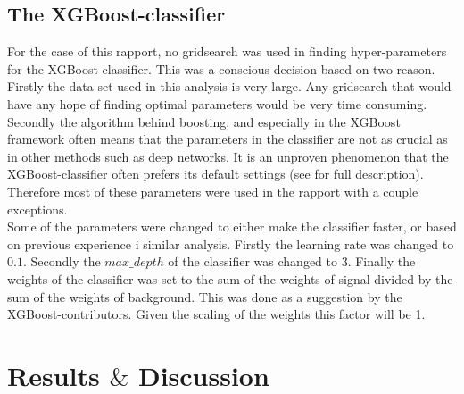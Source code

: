 \documentclass{article}
\begin{document}
\subsection{The XGBoost-classifier}
For the case of this rapport, no gridsearch was used in finding hyper-parameters for the XGBoost-classifier. This was a conscious decision based on two reason. Firstly the data set used in this analysis is very large. Any gridsearch that would have any hope of finding optimal parameters would be very time consuming. Secondly the algorithm behind boosting, and especially in the XGBoost framework often means that the parameters in the classifier are not as crucial as in other methods such as deep networks. It is an unproven phenomenon that the XGBoost-classifier often prefers its default settings (see \cite{XGB} for full description). Therefore most of these parameters were used in the rapport with a couple exceptions.
\\
Some of the parameters were changed to either make the classifier faster, or based on previous experience i similar analysis. Firstly the learning rate was changed to $0.1$. Secondly the $max\_depth$ of the classifier was changed to 3. Finally the weights of the classifier was set to the sum of the weights of signal divided by the sum of the weights of background. This was done as a suggestion by the XGBoost-contributors. Given the scaling of the weights this factor will be 1. 
\section{Results $\&$ Discussion}
\end{document}
